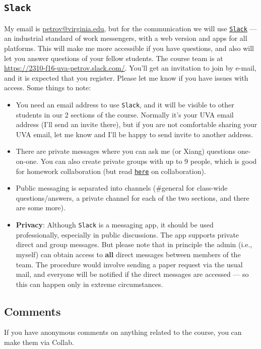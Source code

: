 \documentclass[oneside,11pt]{amsart}
\begin{document}
\subsection{\texttt{Slack}}

My email is \href{mailto:petrov@virginia.edu}{petrov@virginia.edu}, but for the communication we will use \href{https://slack.com}{\texttt{Slack}} --- an industrial standard of work messengers, with a web version and apps for all platforms. This will make me more accessible if you have questions, and also will let you answer questions of your fellow students. The course team is at \url{https://2310-f16-uva-petrov.slack.com/}. You'll get an invitation to join by e-mail, and it is expected that you register. Please let me know if you have issues with access. Some things to note:
\begin{itemize}
	\item You need an email address to use \texttt{Slack}, and it will be visible to other students in our 2 sections of the course. Normally it's your UVA email address (I'll send an invite there), but if you are not comfortable sharing your UVA email, let me know and I'll be happy to send invite to another address.
	\item There are private messages where you can ask me (or Xiang) questions one-on-one. You can also create private groups with up to 9 people, which is good for homework collaboration (but read \hyperref[academic_integrity]{\texttt{here}} on collaboration).
	\item Public messaging is separated into channels (\#general for class-wide questions/answers, a private channel for each of the two sections, and there are some more).
	\item \textbf{Privacy}: Although \texttt{Slack} is a messaging app, it should be used professionally, especially in public discussions. The app supports private direct and group messages. But please note that in principle the admin (i.e., myself) can obtain access to \textbf{all} direct messages between members of the team. The procedure would involve sending a paper request via the usual mail, and everyone will be notified if the direct messages are accessed --- so this can happen only in extreme circumstances.
\end{itemize}

\subsection{Comments}
If you have anonymous comments on anything related to the course, you can make them via Collab.
\end{document}
